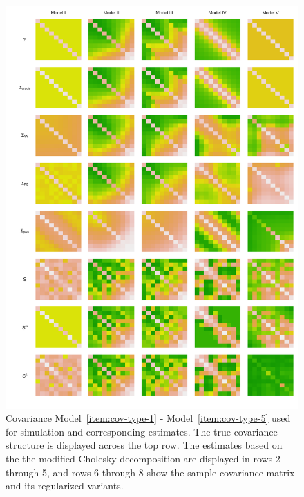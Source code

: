 \captionsetup[subfigure]{labelformat=empty}
\begin{figure}[H] \label{fig:cov-estimate-lattice}
\centering
\caption{Covariance Model~\ref{item:cov-type-1} - Model~\ref{item:cov-type-5} used for simulation and corresponding estimates. The true covariance structure is displayed across the top row. The estimates based on the the modified Cholesky decomposition are displayed in rows 2 through 5, and rows 6 through 8 show the sample covariance matrix and its regularized variants.}
  \includegraphics[width = 1\textwidth]{../img/chapter-4/cov-estimate-lattice}
\end{figure}